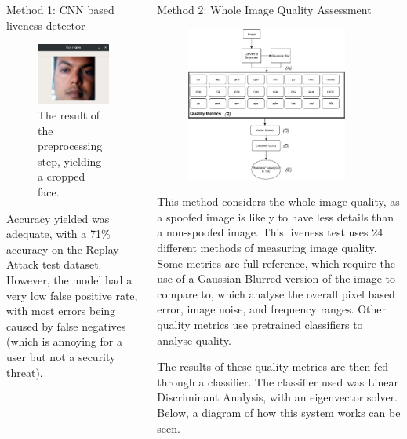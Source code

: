 \documentclass[final]{beamer}
\begin{document}
\begin{frame}{}
\begin{columns}[t]
\begin{column}{.48\linewidth}
\begin{block}{Method 1: CNN based liveness detector}
          \begin{figure}
            \centering
            \includegraphics[width=100px]{FaceExtraction.png}
            \caption{The result of the preprocessing step, yielding a cropped face.}
          \end{figure}

          Accuracy yielded was adequate, with a 71\% accuracy on the Replay Attack test dataset. 
          However, the model had a very low false positive rate,
          with most errors being caused by false negatives (which is annoying for a user but not a security threat).

        \end{block}
      \end{column}

      \begin{column}{.48\linewidth}
        \begin{block}{Method 2: Whole Image Quality Assessment}
          \begin{figure}
            \includegraphics[width=200px]{ImageQualityLivenessTest.pdf}
          \end{figure}
          This method considers the whole image quality, as a spoofed image is likely to have less details than a non-spoofed image.
          This liveness test uses 24 different methods of measuring image quality. Some metrics are full reference, which require the use of a Gaussian Blurred
          version of the image to compare to, which analyse the overall pixel based error, image noise, and frequency ranges. Other quality metrics use pretrained classifiers
          to analyse quality.
        
          The results of these quality metrics are then fed through a classifier. The classifier used was Linear Discriminant Analysis, with an eigenvector solver.
          Below, a diagram of how this system works can be seen.


\end{block}
\end{column}
\end{columns}
\end{frame}
\end{document}

